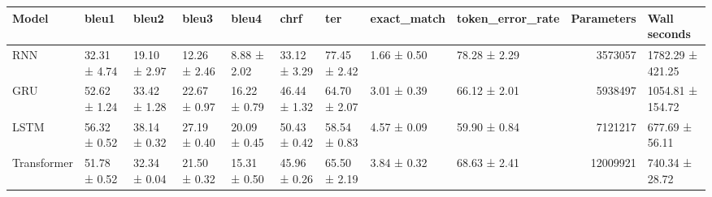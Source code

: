 \begin{tabular}{lllllllllrl}
\toprule
Model & bleu1 & bleu2 & bleu3 & bleu4 & chrf & ter & exact\_match & token\_error\_rate & Parameters & Wall seconds \\
\midrule
RNN & 32.31 ± 4.74 & 19.10 ± 2.97 & 12.26 ± 2.46 & 8.88 ± 2.02 & 33.12 ± 3.29 & 77.45 ± 2.42 & 1.66 ± 0.50 & 78.28 ± 2.29 & 3573057 & 1782.29 ± 421.25 \\
GRU & 52.62 ± 1.24 & 33.42 ± 1.28 & 22.67 ± 0.97 & 16.22 ± 0.79 & 46.44 ± 1.32 & 64.70 ± 2.07 & 3.01 ± 0.39 & 66.12 ± 2.01 & 5938497 & 1054.81 ± 154.72 \\
LSTM & 56.32 ± 0.52 & 38.14 ± 0.32 & 27.19 ± 0.40 & 20.09 ± 0.45 & 50.43 ± 0.42 & 58.54 ± 0.83 & 4.57 ± 0.09 & 59.90 ± 0.84 & 7121217 & 677.69 ± 56.11 \\
Transformer & 51.78 ± 0.52 & 32.34 ± 0.04 & 21.50 ± 0.32 & 15.31 ± 0.50 & 45.96 ± 0.26 & 65.50 ± 2.19 & 3.84 ± 0.32 & 68.63 ± 2.41 & 12009921 & 740.34 ± 28.72 \\
\bottomrule
\end{tabular}
